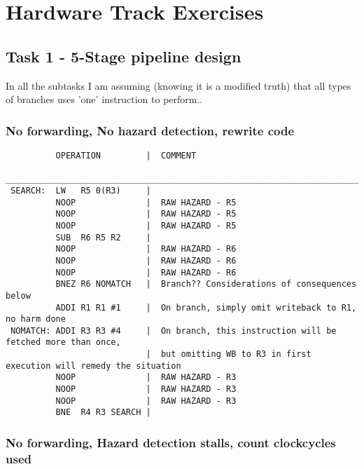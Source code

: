 \documentclass[a4paper,10pt]{article}
\begin{document}
\newpage

\section{Hardware Track Exercises}
\subsection{Task 1 - 5-Stage pipeline design}
In all the subtasks I am assuming (knowing it is a modified truth) that all types of branches uses 'one' instruction to perform..

\subsubsection{No forwarding, No hazard detection, rewrite code}
\begin{verbatim}
          OPERATION         |  COMMENT
 ________________________________________________________________________________________________
 SEARCH:  LW   R5 0(R3)     |
          NOOP              |  RAW HAZARD - R5
          NOOP              |  RAW HAZARD - R5
          NOOP              |  RAW HAZARD - R5
          SUB  R6 R5 R2     |
          NOOP              |  RAW HAZARD - R6
          NOOP              |  RAW HAZARD - R6
          NOOP              |  RAW HAZARD - R6
          BNEZ R6 NOMATCH   |  Branch?? Considerations of consequences below
          ADDI R1 R1 #1     |  On branch, simply omit writeback to R1, no harm done
 NOMATCH: ADDI R3 R3 #4     |  On branch, this instruction will be fetched more than once,
                            |  but omitting WB to R3 in first execution will remedy the situation
          NOOP              |  RAW HAZARD - R3
          NOOP              |  RAW HAZARD - R3
          NOOP              |  RAW HAZARD - R3
          BNE  R4 R3 SEARCH |
\end{verbatim}

\newpage
\subsubsection{No forwarding, Hazard detection stalls, count clockcycles used}
\end{document}
